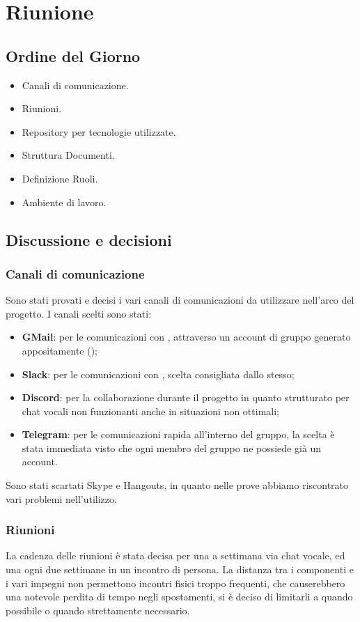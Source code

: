 \section{Riunione}
\subsection{Ordine del Giorno}
\begin{itemize}
	\item Canali di comunicazione.
	\item Riunioni.
	\item Repository per tecnologie utilizzate.
	\item Struttura Documenti.
	\item Definizione Ruoli.
	\item Ambiente di lavoro.
\end{itemize}

\subsection{Discussione e decisioni}
\subsubsection{Canali di comunicazione}
Sono stati provati e decisi i  vari canali di comunicazioni da utilizzare nell'arco del progetto.
I canali scelti sono stati:
\begin{itemize}
	\item \textbf{GMail}: per le comunicazioni con \CommittenteInline{}, attraverso un account di gruppo generato appositamente (\GroupEmail{});
	\item \textbf{Slack}: per le comunicazioni con \Proponente{}, scelta consigliata dallo stesso;
	\item \textbf{Discord}: per la collaborazione durante il progetto in quanto strutturato per chat vocali non funzionanti anche in situazioni non ottimali;
	\item \textbf{Telegram}: per le comunicazioni rapida all'interno del gruppo, la scelta è stata immediata visto che ogni membro del gruppo ne possiede già un account.
\end{itemize}
Sono stati scartati Skype e Hangouts, in quanto nelle prove abbiamo riscontrato vari problemi nell'utilizzo.

\subsubsection{Riunioni}
La cadenza delle riunioni è stata decisa per una a settimana via chat vocale, ed una ogni due settimane in un incontro di persona.
La distanza tra i componenti e i vari impegni non permettono incontri fisici troppo frequenti, che causerebbero una notevole perdita di tempo negli spostamenti, si è deciso di limitarli a quando possibile o quando strettamente necessario.

